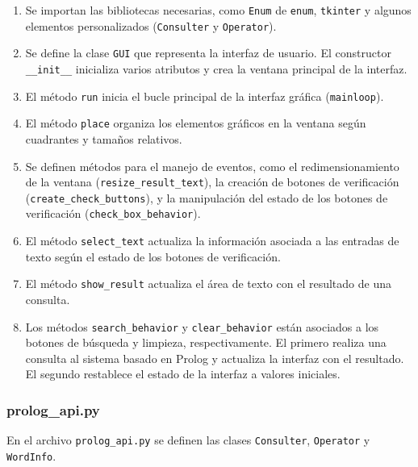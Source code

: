 \documentclass[12pt]{article}
\begin{document}
\begin{enumerate}

    \item Se importan las bibliotecas necesarias, como \texttt{Enum} de \texttt{enum}, \texttt{tkinter} y algunos elementos personalizados (\texttt{Consulter} y \texttt{Operator}).

    \item Se define la clase \texttt{GUI} que representa la interfaz de usuario. El constructor \texttt{\_\_init\_\_} inicializa varios atributos y crea la ventana principal de la interfaz.

    \item El método \texttt{run} inicia el bucle principal de la interfaz gráfica (\texttt{mainloop}).

    \item El método \texttt{place} organiza los elementos gráficos en la ventana según cuadrantes y tamaños relativos.

    \item Se definen métodos para el manejo de eventos, como el redimensionamiento de la ventana (\texttt{resize\_result\_text}), la creación de botones de verificación (\texttt{create\_check\_buttons}), y la manipulación del estado de los botones de verificación (\texttt{check\_box\_behavior}).

    \item El método \texttt{select\_text} actualiza la información asociada a las entradas de texto según el estado de los botones de verificación.

    \item El método \texttt{show\_result} actualiza el área de texto con el resultado de una consulta.

    \item Los métodos \texttt{search\_behavior} y \texttt{clear\_behavior} están asociados a los botones de búsqueda y limpieza, respectivamente. El primero realiza una consulta al sistema basado en Prolog y actualiza la interfaz con el resultado. El segundo restablece el estado de la interfaz a valores iniciales.

\end{enumerate}

\subsubsection{prolog\_api.py}

En el archivo \texttt{prolog\_api.py} se definen las clases \texttt{Consulter}, \texttt{Operator} y \texttt{WordInfo}. \\
\end{document}
